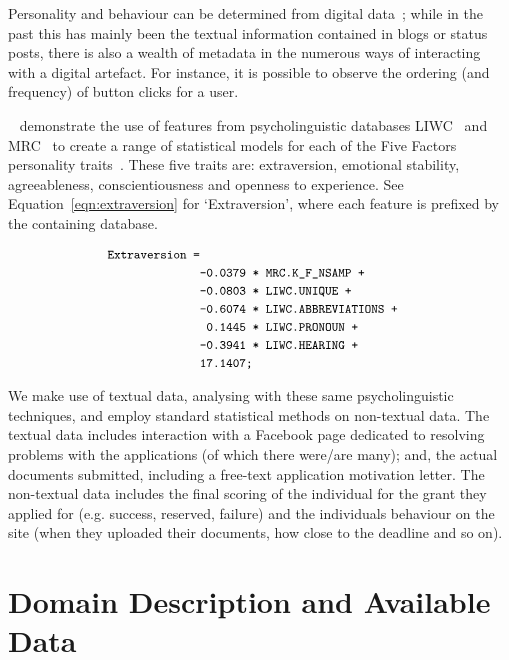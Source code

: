 \documentclass[letterpaper]{article}
\begin{document}
Personality and behaviour can be determined from digital
data~\cite{pennebaker-et-al:2001,vazire+gosling:2004,iacobelli-et-al:2011,oatley+crick:2014};
while in the past this has mainly been the textual information
contained in blogs or status posts, there is also a wealth of metadata
in the numerous ways of interacting with a digital artefact. For
instance, it is possible to observe the ordering (and frequency) of
button clicks for a user.

\citeauthor{mairesse-et-al:2007}~
demonstrate the use of features from psycholinguistic databases
LIWC~\cite{pennebaker-et-al:2001} and MRC~\cite{wilson:1988} to create
a range of statistical models for each of the Five Factors personality
traits~\cite{norman:1963,peabody+goldberg:1989,goldberg:1990}. These
five traits are: extraversion, emotional stability, agreeableness,
conscientiousness and openness to experience. See
Equation~\ref{eqn:extraversion} for `Extraversion', where each feature
is prefixed by the containing database.

\begin{equation}\label{eqn:extraversion}
\small
\begin{aligned}
\verb!Extraversion =!\\
&\verb!-0.0379 * MRC.K_F_NSAMP +!\\
&\verb!-0.0803 * LIWC.UNIQUE +!\\
&\verb!-0.6074 * LIWC.ABBREVIATIONS +!\\
&\verb! 0.1445 * LIWC.PRONOUN +!\\
&\verb!-0.3941 * LIWC.HEARING +!\\  
&\verb!17.1407;!
\end{aligned}
\end{equation}

We make use of textual data, analysing with these same
psycholinguistic techniques, and employ standard statistical methods
on non-textual data. The textual data includes interaction with a
Facebook page dedicated to resolving problems with the applications
(of which there were/are many); and, the actual documents submitted,
including a free-text application motivation letter. The non-textual
data includes the final scoring of the individual for the grant they
applied for (e.g. success, reserved, failure) and the individuals
behaviour on the site (when they uploaded their documents, how close
to the deadline and so on).


\section{Domain Description and Available Data}
\end{document}
